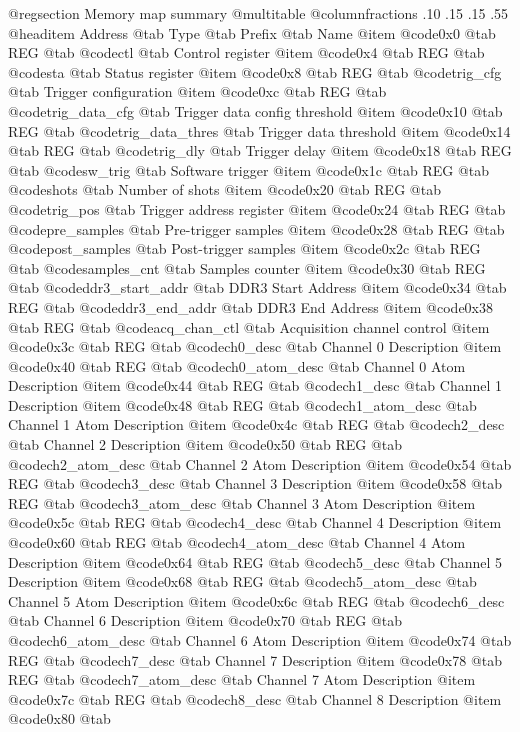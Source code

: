 @regsection Memory map summary
@multitable  @columnfractions .10 .15 .15 .55
@headitem Address @tab Type @tab Prefix @tab Name
@item @code{0x0} @tab
REG @tab
@code{ctl} @tab
Control register
@item @code{0x4} @tab
REG @tab
@code{sta} @tab
Status register
@item @code{0x8} @tab
REG @tab
@code{trig_cfg} @tab
Trigger configuration
@item @code{0xc} @tab
REG @tab
@code{trig_data_cfg} @tab
Trigger data config threshold
@item @code{0x10} @tab
REG @tab
@code{trig_data_thres} @tab
Trigger data threshold
@item @code{0x14} @tab
REG @tab
@code{trig_dly} @tab
Trigger delay
@item @code{0x18} @tab
REG @tab
@code{sw_trig} @tab
Software trigger
@item @code{0x1c} @tab
REG @tab
@code{shots} @tab
Number of shots
@item @code{0x20} @tab
REG @tab
@code{trig_pos} @tab
Trigger address register
@item @code{0x24} @tab
REG @tab
@code{pre_samples} @tab
Pre-trigger samples
@item @code{0x28} @tab
REG @tab
@code{post_samples} @tab
Post-trigger samples
@item @code{0x2c} @tab
REG @tab
@code{samples_cnt} @tab
Samples counter
@item @code{0x30} @tab
REG @tab
@code{ddr3_start_addr} @tab
DDR3 Start Address
@item @code{0x34} @tab
REG @tab
@code{ddr3_end_addr} @tab
DDR3 End Address
@item @code{0x38} @tab
REG @tab
@code{acq_chan_ctl} @tab
Acquisition channel control
@item @code{0x3c} @tab
REG @tab
@code{ch0_desc} @tab
Channel 0 Description
@item @code{0x40} @tab
REG @tab
@code{ch0_atom_desc} @tab
Channel 0 Atom Description
@item @code{0x44} @tab
REG @tab
@code{ch1_desc} @tab
Channel 1 Description
@item @code{0x48} @tab
REG @tab
@code{ch1_atom_desc} @tab
Channel 1 Atom Description
@item @code{0x4c} @tab
REG @tab
@code{ch2_desc} @tab
Channel 2 Description
@item @code{0x50} @tab
REG @tab
@code{ch2_atom_desc} @tab
Channel 2 Atom Description
@item @code{0x54} @tab
REG @tab
@code{ch3_desc} @tab
Channel 3 Description
@item @code{0x58} @tab
REG @tab
@code{ch3_atom_desc} @tab
Channel 3 Atom Description
@item @code{0x5c} @tab
REG @tab
@code{ch4_desc} @tab
Channel 4 Description
@item @code{0x60} @tab
REG @tab
@code{ch4_atom_desc} @tab
Channel 4 Atom Description
@item @code{0x64} @tab
REG @tab
@code{ch5_desc} @tab
Channel 5 Description
@item @code{0x68} @tab
REG @tab
@code{ch5_atom_desc} @tab
Channel 5 Atom Description
@item @code{0x6c} @tab
REG @tab
@code{ch6_desc} @tab
Channel 6 Description
@item @code{0x70} @tab
REG @tab
@code{ch6_atom_desc} @tab
Channel 6 Atom Description
@item @code{0x74} @tab
REG @tab
@code{ch7_desc} @tab
Channel 7 Description
@item @code{0x78} @tab
REG @tab
@code{ch7_atom_desc} @tab
Channel 7 Atom Description
@item @code{0x7c} @tab
REG @tab
@code{ch8_desc} @tab
Channel 8 Description
@item @code{0x80} @tab
